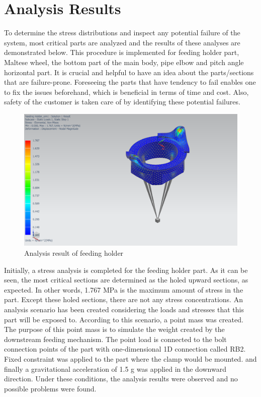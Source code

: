 \documentclass[12pt]{article}
\begin{document}
\section{Analysis Results}

To determine the stress distributions and inspect any potential failure of the system, most critical parts are analyzed and the results of these analyses are demonstrated below. This procedure is implemented for feeding holder part, Maltese wheel, the bottom part of the main body, pipe elbow and pitch angle horizontal part. It is crucial and helpful to have an idea about the parts/sections that are failure-prone. Foreseeing the parts that have tendency to fail enables one to fix the issues beforehand, which is beneficial in terms of time and cost. Also, safety of the customer is taken care of by identifying these potential failures.


\begin{figure}[H]
    \centering
    \includegraphics[width=0.65\linewidth]{feedingholderfinal.png}
    \caption{Analysis result of feeding holder}
    \label{fig:feedingholderanalysis}
\end{figure}

Initially, a stress analysis is completed for the feeding holder part. As it can be seen, the most critical sections are determined as the holed upward sections, as expected. In other words, 1.767 MPa is the maximum amount of stress in the part. Except these holed sections, there are not any stress concentrations. 
An analysis scenario has been created considering the loads and stresses that this part will be exposed to. According to this scenario, a point mass was created.  The purpose of this point mass is to simulate the weight created by the downstream feeding mechanism. The point load is connected to the bolt connection points of the part with one-dimensional 1D connection called RB2. Fixed constraint was applied to the part where the clamp would be mounted. and finally a gravitational acceleration of 1.5 g was applied in the downward direction. Under these conditions, the analysis results were observed and no possible problems were found.
\end{document}
